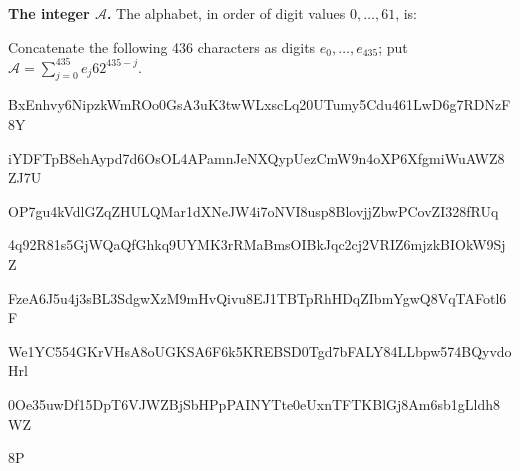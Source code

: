 \textbf{The integer $\mathcal A$.}
The alphabet, in order of digit values $0,\ldots,61$, is:\par
{}\par
Concatenate the following 436 characters as digits $e_0,\ldots,e_{435}$;
put $\mathcal A=\sum_{j=0}^{435}e_j62^{435-j}$.\par
\begingroup\small\ttfamily
BxEnhvy6NipzkWmROo0GsA3uK3twWLxscLq20UTumy5Cdu461LwD6g7RDNzF8Y\par
iYDFTpB8ehAypd7d6OsOL4APamnJeNXQypUezCmW9n4oXP6XfgmiWuAWZ8ZJ7U\par
OP7gu4kVdlGZqZHULQMar1dXNeJW4i7oNVI8usp8BlovjjZbwPCovZI328fRUq\par
4q92R81s5GjWQaQfGhkq9UYMK3rRMaBmsOIBkJqc2cj2VRIZ6mjzkBIOkW9SjZ\par
FzeA6J5u4j3sBL3SdgwXzM9mHvQivu8EJ1TBTpRhHDqZIbmYgwQ8VqTAFotl6F\par
We1YC554GKrVHsA8oUGKSA6F6k5KREBSD0Tgd7bFALY84LLbpw574BQyvdoHrl\par
0Oe35uwDf15DpT6VJWZBjSbHPpPAINYTte0eUxnTFTKBlGj8Am6sb1gLldh8WZ\par
8P\par
\endgroup

\endgroup

